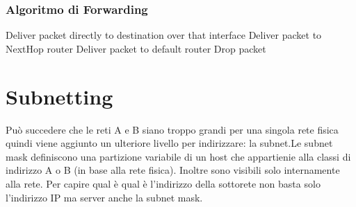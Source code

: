 \subsubsection{Algoritmo di Forwarding}
\begin{algorithm}
\caption{PacketForwarding}
\begin{algorithmic}[1]
        \State Deliver packet directly to destination over that interface
        \State Deliver packet to NextHop router
        \State Deliver packet to default router
    \Else
        \State Drop packet
    \EndIf
\EndProcedure
\end{algorithmic}
\end{algorithm}
\section{Subnetting}
Può succedere che le reti A e B siano troppo grandi per una singola rete fisica quindi viene aggiunto un ulteriore livello per indirizzare: la subnet.Le subnet mask definiscono una partizione variabile di un host che appartienie alla classi di indirizzo A o B (in base alla rete fisica). Inoltre sono visibili solo internamente alla rete. Per capire qual è qual è l'indirizzo della sottorete non basta solo l'indirizzo IP ma server anche la subnet mask.
